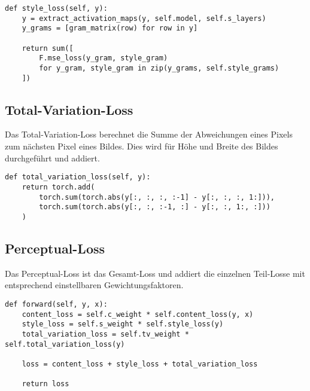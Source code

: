 \begin{listing}[H]
\begin{verbatim}
def style_loss(self, y):
    y = extract_activation_maps(y, self.model, self.s_layers)
    y_grams = [gram_matrix(row) for row in y]

    return sum([
        F.mse_loss(y_gram, style_gram)
        for y_gram, style_gram in zip(y_grams, self.style_grams)
    ])
\end{verbatim}
\end{listing}

\subsection{Total-Variation-Loss}

Das Total-Variation-Loss berechnet die Summe der Abweichungen eines Pixels zum nächsten Pixel eines Bildes. Dies wird für Höhe und Breite des Bildes durchgeführt und addiert.

\begin{listing}[H]
\begin{verbatim}
def total_variation_loss(self, y):
    return torch.add(
        torch.sum(torch.abs(y[:, :, :, :-1] - y[:, :, :, 1:])),
        torch.sum(torch.abs(y[:, :, :-1, :] - y[:, :, 1:, :]))
    )
\end{verbatim}
\end{listing}

\subsection{Perceptual-Loss}

Das Perceptual-Loss ist das Gesamt-Loss und addiert die einzelnen Teil-Losse mit entsprechend einstellbaren Gewichtungsfaktoren.

\begin{listing}[H]
\begin{verbatim}
def forward(self, y, x):
    content_loss = self.c_weight * self.content_loss(y, x)
    style_loss = self.s_weight * self.style_loss(y)
    total_variation_loss = self.tv_weight * self.total_variation_loss(y)

    loss = content_loss + style_loss + total_variation_loss

    return loss
\end{verbatim}
\end{listing}

